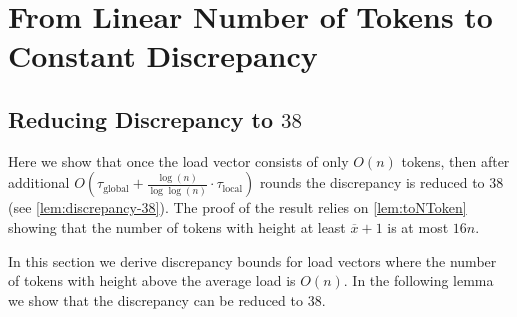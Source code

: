 \documentclass[twoside,leqno]{article}
\DeclareMathOperator{\1}{\mathbf{1}}
\newcommand{\taulocal}{\tau_{\mathrm{local}}}
\newcommand{\tauglobal}{\tau_{\mathrm{global}}}
\numberwithin{equation}{section}
\begin{document}
\section{From Linear Number of Tokens to Constant Discrepancy}\label{sec:arbitrary}


\subsection{Reducing Discrepancy to $38$}\label{sec:discrepancy-38}
Here we show that once the load vector consists of only $O(n)$ tokens, then after additional
$O( \tauglobal + \frac{\log (n)}{\log \log (n)} \cdot \taulocal)$ rounds the discrepancy is reduced to $38$ (see \cref{lem:discrepancy-38}). The proof of the result relies on \cref{lem:toNToken} showing that the number of tokens with height at least $\overline{x}+1$ is at most $16n$. 

In this section we derive discrepancy bounds for load vectors where the number of tokens with height above the average load is $O(n)$. In the following lemma we show that the discrepancy can be reduced to $38$.
\end{document}
